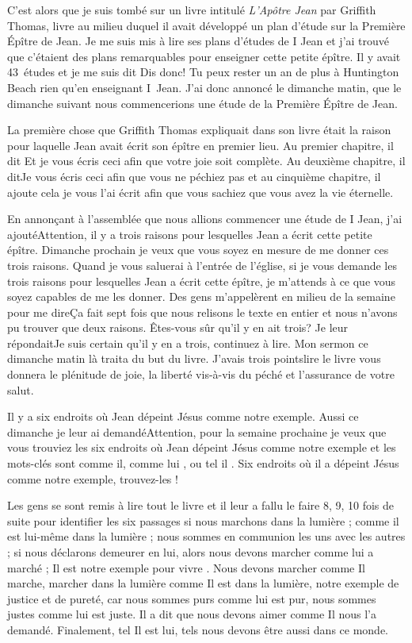 C’est alors que je suis tombé sur un livre intitulé \emph{L’Apôtre Jean} par Griffith Thomas, livre au milieu duquel il avait
développé un plan d’étude sur la Première Épître de Jean. Je me suis mis à lire ses plans d’études de I Jean et j'ai
trouvé que c’étaient des plans remarquables pour enseigner cette petite épître. Il y avait 43~études et je me suis dit\frcolon
\og Dis donc! Tu peux rester un an de plus à Huntington Beach rien qu’en enseignant I~Jean. \fg{} J'ai donc annoncé le
dimanche matin, que le dimanche suivant nous commencerions une étude de la Première Épître de Jean.

La première chose que Griffith Thomas expliquait dans son livre était la raison pour laquelle Jean avait écrit son
épître en premier lieu. Au premier chapitre, il dit \og Et je vous écris ceci afin que votre joie soit complète\fg{}. Au deuxième
chapitre, il dit\frcolon\og Je vous écris ceci afin que vous ne péchiez pas \fg{} et au cinquième chapitre, il ajoute \og cela je vous l’ai
écrit afin que vous sachiez que vous avez la vie éternelle\fg{}.

En annonçant à l'assemblée que nous allions commencer une étude de I Jean, j'ai ajouté\frcolon\og Attention, il y a trois
raisons pour lesquelles Jean a écrit cette petite épître. Dimanche prochain je veux que vous soyez en mesure de me
donner ces trois raisons. Quand je vous saluerai à l’entrée de l’église, si je vous demande les trois raisons pour
lesquelles Jean a écrit cette épître, je m’attends à ce que vous soyez capables de me les donner\fg{}. Des gens
m’appelèrent en milieu de la semaine pour me dire\frcolon\og Ça fait sept fois que nous relisons le texte en entier et nous
n'avons pu trouver que deux raisons. Êtes-vous sûr qu’il y en ait trois?\fg{} Je leur répondait\frcolon\og Je suis certain qu’il y en a
trois, continuez à lire.\fg{} Mon sermon ce dimanche matin là traita du but du livre. J’avais trois points\frcolon lire le livre vous
donnera le plénitude de joie, la liberté vis-à-vis du péché et l’assurance de votre salut.

Il y a six endroits où Jean dépeint Jésus comme notre exemple. Aussi ce dimanche je leur ai demandé\frcolon\og Attention,
pour la semaine prochaine je veux que vous trouviez les six endroits où Jean dépeint Jésus comme notre exemple et
les mots-clés sont \og comme il\fg{}, \og comme lui \fg{}, ou \og tel il \fg{}. Six endroits où il a dépeint Jésus comme notre exemple,
trouvez-les !\fg{}

Les gens se sont remis à lire tout le livre et il leur a fallu le faire 8, 9, 10 fois de suite pour identifier les six passages\frcolon
si nous marchons dans la lumière ; comme il est lui-même dans la lumière ; nous sommes en communion les uns
avec les autres ; si nous déclarons demeurer en lui, alors nous devons marcher comme lui a marché ; Il est notre
exemple pour vivre . Nous devons marcher comme Il marche, marcher dans la lumière comme Il est dans la lumière,
notre exemple de justice et de pureté, car nous sommes purs comme lui est pur, nous sommes justes comme lui est
juste. Il a dit que nous devons aimer comme Il nous l’a demandé. Finalement, tel Il est lui, tels nous devons être
aussi dans ce monde.

